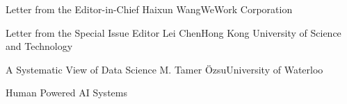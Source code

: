 \documentclass[11pt]{article}
\begin{document}


\begin{bulletin}


%
%

\begin{lettersection}
\begin{letter}{Letter from the Editor-in-Chief}
{Haixun Wang}{WeWork Corporation}

\end{letter}
%
\newpage
%
%
\begin{letter}{Letter from the Special Issue Editor}
{Lei Chen}{Hong Kong University of Science and Technology}

\end{letter}

\end{lettersection}


\begin{opinionsection}
\begin{opinion}{A Systematic View of Data Science}
{M. Tamer \"{O}zsu}{University of Waterloo}

\end{opinion}
\end{opinionsection}

\begin{articlesection}{Human Powered AI Systems}


\end{articlesection}
\end{bulletin}
\end{document}
